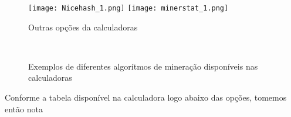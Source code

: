 \begin{figure}[H]
	\centering
	\caption{Outras opções da calculadoras}\label{opcoes}
	\texttt{[image: Nicehash\_1.png]}
	\texttt{[image: minerstat\_1.png]}\\
\end{figure}

\begin{figure}[H]\label{algorits}
	\centering {}
	\caption{Exemplos de diferentes algorítmos de mineração disponíveis nas calculadoras}
	\hfill
	\par 
	\\
	 
	\label{fig}
\end{figure}


Conforme a tabela disponível na calculadora logo abaixo das opções, tomemos então nota 

